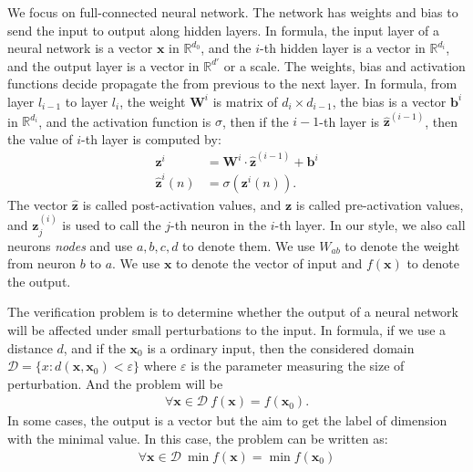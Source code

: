 \documentclass{llncs}
\begin{document}

We focus on full-connected neural network. The network has weights and bias to send the input to output along hidden layers. In formula, the input layer of a neural network is a vector $\boldsymbol{x}$ in $\mathbb{R}^{d_0}$, and the $i$-th hidden layer  is a vector in $\mathbb{R}^{d_i}$, and the output layer is a vector in $\mathbb{R}^{d'}$ or a scale. The weights, bias and activation functions decide propagate the from previous to the next layer. In formula, from layer $l_{i-1}$ to layer $l_{i}$, the weight $\boldsymbol{W}^i$ is matrix of $d_i\times d_{i-1}$, the bias is a vector $\boldsymbol{b}^i$ in $\mathbb{R}^{d_i}$, and the activation function is $\sigma$, then  if the $i-1$-th layer is $\hat{\boldsymbol{z}}^{(i-1)}$, then the value of $i$-th layer is computed by: \begin{align*}
	{\boldsymbol{z}}^{i} &= \boldsymbol{W}^i\cdot \hat{\boldsymbol{z}}^{(i-1)}+ \boldsymbol{b}^i\\
	\hat{\boldsymbol{z}}^{i}(n) &= \sigma({\boldsymbol{z}}^i(n)).
\end{align*} The vector $\hat{\boldsymbol{z}}$ is called post-activation values, and $\boldsymbol{z}$ is called pre-activation values, and $\boldsymbol{z}^{(i)}_j$ is used to call the $j$-th neuron in the $i$-th layer. In our style, we also call neurons \emph{nodes} and use $a,b,c,d$ to denote them. We use $W_{ab}$ to denote the weight from neuron $b$ to $a$. We use $\boldsymbol{x}$ to denote the vector of input and  $f(\boldsymbol{x})$ to denote the output.


The verification problem is to determine whether the output of a neural network will be affected under small perturbations to the input. In formula, if we use a distance $d$, and if the $\boldsymbol{x}_0$ is a ordinary input, then the considered domain $\mathcal{D}=\{x: d(\boldsymbol{x},\boldsymbol{x}_0)<\varepsilon\}$ where $\varepsilon$ is the parameter measuring the size of perturbation. And the problem will be \begin{align*}
	\forall \boldsymbol{x}\in\mathcal{D} \   f(\boldsymbol{x}) = f(\boldsymbol{x}_0).
\end{align*} In some cases, the output is a vector but the aim to get the label of dimension with the minimal value. In this case, the problem can be written as:\begin{align*}
\forall \boldsymbol{x} \in\mathcal{D} \  \min f(\boldsymbol{x}) = \min f(\boldsymbol{x}_0)
\end{align*}
\end{document}

